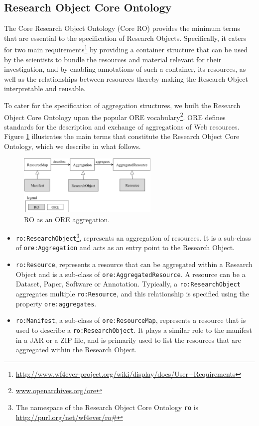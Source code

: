 \subsection{Research Object Core Ontology} 
The Core Research Object Ontology (Core RO) provides the minimum terms that are essential to the specification of Research Objects. Specifically, it caters for two main requirements\footnote{\url{http://www.wf4ever-project.org/wiki/display/docs/User+Requirements}} by providing a container structure that can be used by the scientists to bundle the resources and material relevant for their investigation, and by enabling annotations of such a container, its resources, as well as the relationships between resources thereby making the Research Object interpretable and reusable. 

To cater for the specification of aggregation structures, we built the Research Object Core Ontology upon the popular ORE vocabulary\footnote{\url{www.openarchives.org/ore}}. ORE defines standards for the description and exchange of aggregations of Web resources. 
Figure \ref{fig:ro_ontology} illustrates the main terms that constitute the Research Object Core Ontology, which we describe in what follows.


\begin{figure}[ht]
  \centering
  \includegraphics[width=0.6\textwidth]{Figures/ro_ontology_1.png}
  \caption{RO as an ORE aggregation.}
  \label{fig:ro_ontology}
\end{figure}

\begin{itemize}
\item
\texttt{ro:ResearchObject}\footnote{The namespace of the Research Object Core Ontology \texttt{ro} is \url{http://purl.org/net/wf4ever/ro\#}}, represents an aggregation of resources. It is a sub-class of \texttt{ore:Aggregation} and acts as an entry point to the Research Object.
\item
\texttt{ro:Resource}, represents a resource that can be aggregated within a Research Object and is a sub-class of \texttt{ore:AggregatedResource}. A resource can be a Dataset, Paper, Software or Annotation. Typically, a \texttt{ro:ResearchObject} aggregates multiple \texttt{ro:Resource}, and this relationship is specified using the property \texttt{ore:aggregates}.
\item
\texttt{ro:Manifest}, a sub-class of \texttt{ore:ResourceMap}, represents a resource that is used to describe a \texttt{ro:ResearchObject}. It plays a similar role to the manifest in a JAR or a ZIP file, and is primarily used to list the resources that are aggregated within the Research Object.
\end{itemize}

